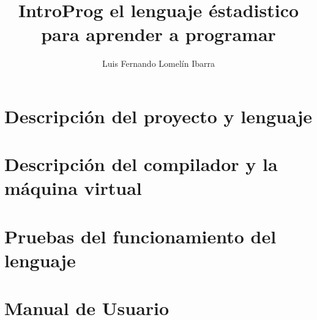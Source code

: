 \documentclass[krantz1,ChapterTOCs, spanish]{krantz}
\begin{document}
\frontmatter

\title{IntroProg el lenguaje éstadistico para aprender a programar 
}
\author{Luis Fernando Lomelín Ibarra}

\maketitle


\cleardoublepage
\setcounter{page}{7} %
\tableofcontents
%
%
%
%

\mainmatter

\part{Descripción del proyecto y lenguaje}



%

\part{Descripción del compilador y la máquina virtual}




\part{Pruebas del funcionamiento del lenguaje}


\part{Manual de Usuario}

\end{document}
